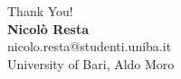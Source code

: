\documentclass[aspectratio=169]{beamer}
\begin{document}
\begin{frame}
  \centering
  \Huge Thank You! \\
  \vspace{0.5cm}
  \normalsize
  \textbf{Nicolò Resta} \\
  nicolo.resta@studenti.uniba.it \\
  University of Bari, Aldo Moro \\

\end{frame}
\end{document}

